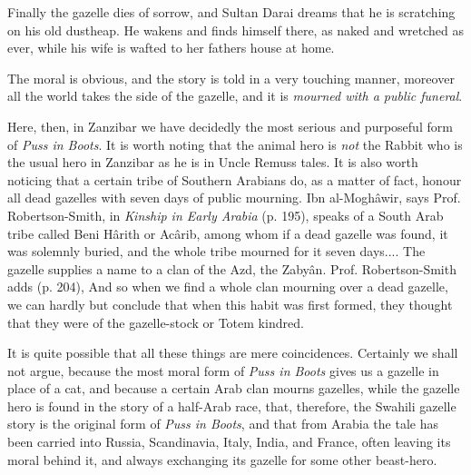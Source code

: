 \documentclass[14pt,a4paper]{memoir}
\begin{document}
Finally the gazelle dies of sorrow, and Sultan Darai dreams that he is
scratching on his old dustheap. He wakens and finds himself there, as
naked and wretched as ever, while his wife is wafted to her
father\textquotesingle s house at home.

The moral is obvious, and the story is told in a very touching manner,
moreover all the world takes the side of the gazelle, and it is
\emph{mourned with a public funeral}.

Here, then, in Zanzibar we have decidedly the most serious and
purposeful form of \emph{Puss in Boots}. It is worth noting that the
animal hero is \emph{not} the Rabbit who is the usual hero in Zanzibar
as he is in Uncle Remus\textquotesingle s tales. It is also worth
noticing that a certain tribe of Southern Arabians do, as a matter of
fact, honour all dead gazelles with seven days of public mourning.
\textquotesingle Ibn al-Moghâwir,\textquotesingle{} says Prof.
Robertson-Smith, in \emph{Kinship in Early Arabia} (p. 195),
\textquotesingle speaks of a South Arab tribe called Beni Hârith or
Acârib, among whom if a dead gazelle was found, it was solemnly buried,
and the whole tribe mourned for it seven days.... The gazelle supplies a
name to a clan of the Azd, the Zabyân.\textquotesingle{} Prof.
Robertson-Smith adds (p. 204), \textquotesingle And so when we find a
whole clan mourning over a dead gazelle, we can hardly but conclude that
when this habit was first formed, they thought that they were of the
gazelle-stock\textquotesingle{} or Totem kindred.

It is quite possible that all these things are mere coincidences.
Certainly we shall not argue, because the most moral form of \emph{Puss
in Boots} gives us a gazelle in place of a cat, and because a certain
Arab clan mourns gazelles, while the gazelle hero is found in the story
of a half-Arab race, that, therefore, the Swahili gazelle story is the
original form of \emph{Puss in Boots}, and that from Arabia the tale has
been carried into Russia, Scandinavia, Italy, India, and France, often
leaving its moral behind it, and always exchanging its gazelle for some
other beast-hero.
\end{document}
